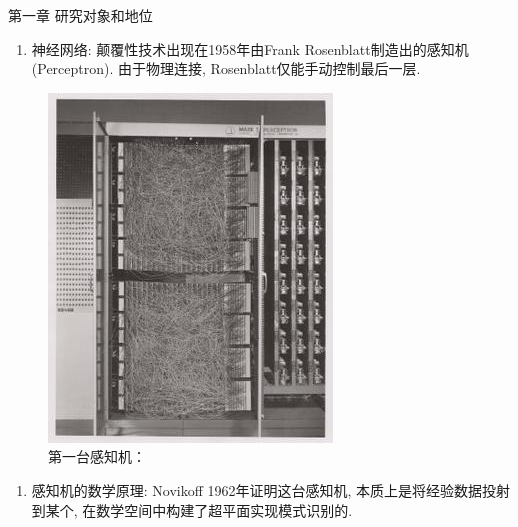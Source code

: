 \documentclass[compress,10pt,dvipsnames,notheorems]{beamer} %
\begin{document}
\begin{frame}{第一章 研究对象和地位}
\begin{solu}
\begin{enumerate}
\item 神经网络: 颠覆性技术出现在1958年由Frank Rosenblatt制造出的感知机(Perceptron). 由于物理连接, Rosenblatt仅能手动控制最后一层.
\end{enumerate}
\end{solu}
\begin{figure}
\includegraphics[width=.3\linewidth]{Imgs/Mark_I_perceptron.jpeg}
\captionsetup{labelformat=empty}
\caption{第一台感知机： {\color{red}{神经网络是科学、并且是颠覆性科学}}}
\end{figure}
\begin{solu}
\begin{enumerate}
\item 感知机的数学原理: Novikoff 1962年证明这台{\color{red}{完全受神经学研究启发下制造出来的}}感知机, 本质上是将经验数据投射到某个{\color{red}{抽象数学空间}}, 在数学空间中构建了超平面实现模式识别的.
\end{enumerate}
\end{solu}
\end{frame}
\end{document}
